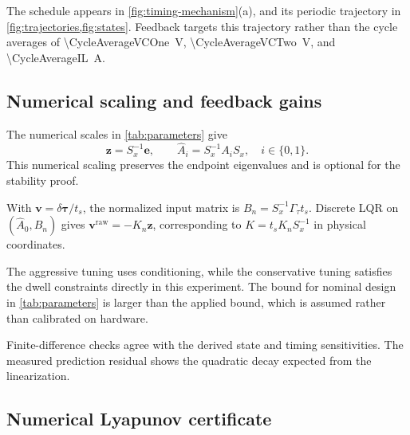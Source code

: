 \documentclass[pdflatex,iicol,sn-mathphys-ay]{sn-jnl}
\newcommand{\vect}[1]{\bm{#1}}
\newcommand{\dtau}{\delta\vect{\tau}}
\begin{document}
The schedule appears in \cref{fig:timing-mechanism}(a), and its periodic trajectory in \cref{fig:trajectories,fig:states}. Feedback targets this trajectory rather than the cycle averages of \SI{\CycleAverageVCOne}{\volt}, \SI{\CycleAverageVCTwo}{\volt}, and \SI{\CycleAverageIL}{\ampere}.

\subsection{Numerical scaling and feedback gains}

The numerical scales in \cref{tab:parameters} give
\begin{equation}
    \vect{z}=S_x^{-1}\vect{e},\qquad
    \widehat A_i=S_x^{-1}A_iS_x,\quad i\in\{0,1\}.
    \label{eq:normalized-endpoints}
\end{equation}
This numerical scaling preserves the endpoint eigenvalues and is optional for the stability proof.

With $\vect{v}=\dtau/t_s$, the normalized input matrix is $B_n=S_x^{-1}\Gamma_\tau t_s$. Discrete LQR on $(\widehat A_0,B_n)$ gives $\vect{v}^{\mathrm{raw}}=-K_n\vect{z}$, corresponding to $K=t_sK_nS_x^{-1}$ in physical coordinates.

The aggressive tuning uses conditioning, while the conservative tuning satisfies the dwell constraints directly in this experiment. The bound for nominal design in \cref{tab:parameters} is larger than the applied bound, which is assumed rather than calibrated on hardware.

Finite-difference checks agree with the derived state and timing sensitivities. The measured prediction residual shows the quadratic decay expected from the linearization.

\subsection{Numerical Lyapunov certificate}
\end{document}
